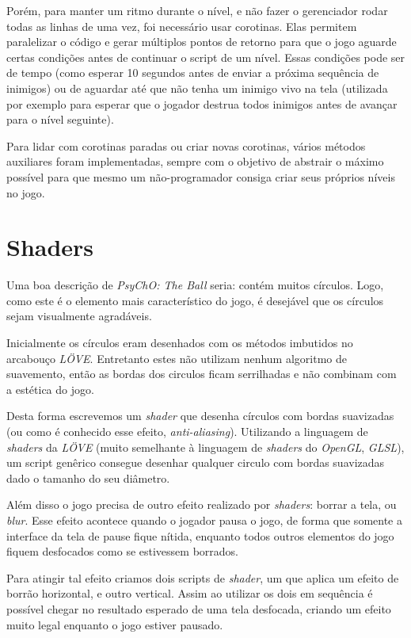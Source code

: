 Porém, para manter um ritmo durante o nível, e não fazer o gerenciador rodar todas as linhas de uma vez, foi necessário usar corotinas. Elas permitem paralelizar o código e gerar múltiplos pontos de retorno para que o jogo aguarde certas condições antes de continuar o script de um nível. Essas condições pode ser de tempo (como esperar 10 segundos antes de enviar a próxima sequência de inimigos) ou de aguardar até que não tenha um inimigo vivo na tela (utilizada por exemplo para esperar que o jogador destrua todos inimigos antes de avançar para o nível seguinte).

Para lidar com corotinas paradas ou criar novas corotinas, vários métodos auxiliares foram implementadas, sempre com o objetivo de abstrair o máximo possível para que mesmo um não-programador consiga criar seus próprios níveis no jogo.

\section{Shaders}
\label{sec:shaders}

Uma boa descrição de \textit{PsyChO: The Ball} seria: contém muitos círculos. Logo, como este é o elemento mais característico do jogo, é desejável que os círculos sejam visualmente agradáveis.

Inicialmente os círculos eram desenhados com os métodos imbutidos no arcabouço \textit{LÖVE}. Entretanto estes não utilizam nenhum algoritmo de suavemento, então as bordas dos circulos ficam serrilhadas e não combinam com a estética do jogo.

Desta forma escrevemos um \textit{shader} que desenha círculos com bordas suavizadas (ou como é conhecido esse efeito, \textit{anti-aliasing}). Utilizando a linguagem de \textit{shaders} da \textit{LÖVE} (muito semelhante à linguagem de \textit{shaders} do \textit{OpenGL}, \textit{GLSL}), um script genêrico consegue desenhar qualquer circulo com bordas suavizadas dado o tamanho do seu diâmetro.

Além disso o jogo precisa de outro efeito realizado por \textit{shaders}: borrar a tela, ou \textit{blur}. Esse efeito acontece quando o jogador pausa o jogo, de forma que somente a interface da tela de pause fique nítida, enquanto todos outros elementos do jogo fiquem desfocados como se estivessem borrados.

Para atingir tal efeito criamos dois scripts de \textit{shader}, um que aplica um efeito de borrão horizontal, e outro vertical. Assim ao utilizar os dois em sequência é possível chegar no resultado esperado de uma tela desfocada, criando um efeito muito legal enquanto o jogo estiver pausado.

